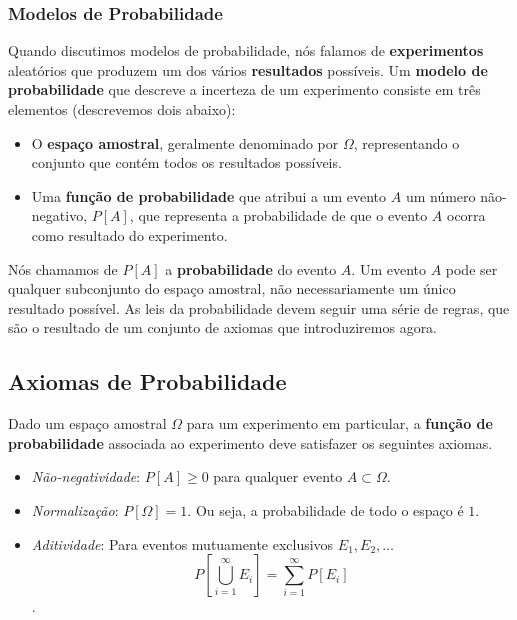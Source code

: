 \documentclass[]{article}
\providecommand{\tightlist}{%
  \setlength{\itemsep}{0pt}\setlength{\parskip}{0pt}}
\begin{document}
\subsubsection{Modelos de Probabilidade}\label{modelos-de-probabilidade}

Quando discutimos modelos de probabilidade, nós falamos de
\textbf{experimentos} aleatórios que produzem um dos vários
\textbf{resultados} possíveis. Um \textbf{modelo de probabilidade} que
descreve a incerteza de um experimento consiste em três elementos
(descrevemos dois abaixo):

\begin{itemize}
\tightlist
\item
  O \textbf{espaço amostral}, geralmente denominado por \(\Omega\),
  representando o conjunto que contém todos os resultados possíveis.
\item
  Uma \textbf{função de probabilidade} que atribui a um evento \(A\) um
  número não-negativo, \(P[A]\), que representa a probabilidade de que o
  evento \(A\) ocorra como resultado do experimento.
\end{itemize}

Nós chamamos de \(P[A]\) a \textbf{probabilidade} do evento \(A\). Um
evento \(A\) pode ser qualquer subconjunto do espaço amostral, não
necessariamente um único resultado possível. As leis da probabilidade
devem seguir uma série de regras, que são o resultado de um conjunto de
axiomas que introduziremos agora.

\subsection{Axiomas de Probabilidade}\label{axiomas-de-probabilidade}

Dado um espaço amostral \(\Omega\) para um experimento em particular, a
\textbf{função de probabilidade} associada ao experimento deve
satisfazer os seguintes axiomas.

\begin{itemize}
\tightlist
\item
  \emph{Não-negatividade}: \(P[A] \geq 0\) para qualquer evento
  \(A \subset\Omega\).
\item
  \emph{Normalização}: \(P[\Omega] = 1\). Ou seja, a probabilidade de
  todo o espaço é \(1\).
\item
  \emph{Aditividade}: Para eventos mutuamente exclusivos
  \(E_1, E_2,\ldots\)
  \[P\left[\bigcup_{i = 1}^{\infty} E_i\right] = \sum_{i = 1}^{\infty} P[E_i]\].
\end{itemize}
\end{document}
